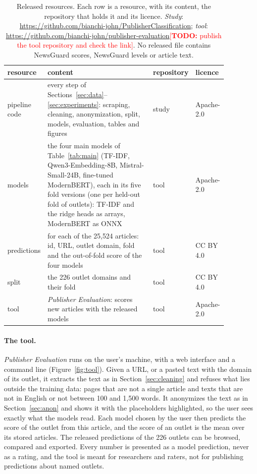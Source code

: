 \documentclass[11pt,a4paper]{article}
\newcommand{\todo}[1]{\textcolor{red}{[\textbf{TODO:} #1]}}
\begin{document}
\begin{table}[t]
\centering\small
\caption{Released resources. Each row is a resource, with its content, the repository that holds it and its licence.
\emph{Study}: \url{https://github.com/bianchi-john/PublisherClassification}; \emph{tool}:
\url{https://github.com/bianchi-john/publisher-evaluation}\todo{publish the tool repository and check the
link}. No released file contains NewsGuard scores, NewsGuard levels or article text.}\label{tab:release}
\begin{tabular}{p{0.15\linewidth}p{0.50\linewidth}p{0.11\linewidth}p{0.12\linewidth}}
\toprule
resource & content & repository & licence \\
\midrule
pipeline code & every step of Sections~\ref{sec:data}--\ref{sec:experiments}: scraping, cleaning, anonymization,
  split, models, evaluation, tables and figures & study & Apache-2.0 \\
models & the four main models of Table~\ref{tab:main} (TF-IDF, Qwen3-Embedding-8B, Mistral-Small-24B,
  fine-tuned ModernBERT), each in its five fold versions (one per held-out fold of outlets):
  TF-IDF and the ridge heads as arrays, ModernBERT as ONNX & tool & Apache-2.0 \\
predictions & for each of the 25,524 articles: id, URL, outlet domain, fold and the out-of-fold score of the four
  models & tool & CC BY 4.0 \\
split & the 226 outlet domains and their fold & tool & CC BY 4.0 \\
tool & \emph{Publisher Evaluation}: scores new articles with the released models & tool & Apache-2.0 \\
\bottomrule
\end{tabular}
\end{table}

\paragraph{The tool.} \emph{Publisher Evaluation} runs on the user's machine, with a web interface and a command line
(Figure~\ref{fig:tool}). Given a URL, or a pasted text with the domain of its outlet, it extracts the text as in
Section~\ref{sec:cleaning} and refuses what lies outside the training data: pages that are not a single article and
texts that are not in English or not between 100 and 1,500 words. It anonymizes the text as in Section~\ref{sec:anon}
and shows it with the placeholders highlighted, so the user sees exactly what the models read. Each model chosen by the
user then predicts the score of the outlet from this article, and the score of an outlet is the mean over its stored
articles. The released predictions of the 226 outlets can be browsed, compared and exported. Every number is presented
as a model prediction, never as a rating, and the tool is meant for researchers and raters, not for publishing
predictions about named outlets.
\end{document}
